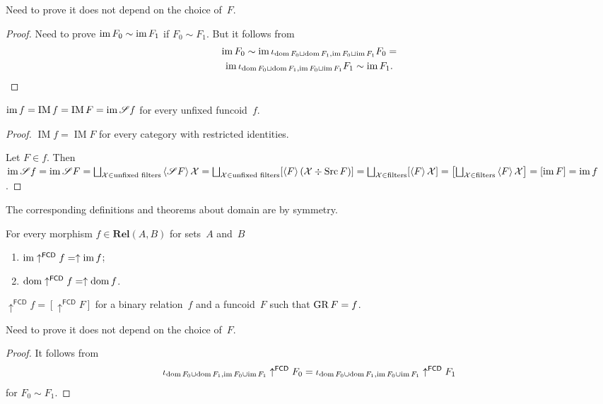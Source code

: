 Need to prove it does not depend on the choice of~$F$.

\begin{proof}
Need to prove $\operatorname{im} F_0\sim\operatorname{im} F_1$ if $F_0\sim F_1$. But it follows from
\begin{multline*}
\operatorname{im} F_0\sim\operatorname{im}\iota_{\operatorname{dom} F_0\sqcup\operatorname{dom} F_1,\operatorname{im} F_0\sqcup\operatorname{im} F_1}F_0=\\\operatorname{im}\iota_{\operatorname{dom} F_0\sqcup\operatorname{dom} F_1,\operatorname{im} F_0\sqcup\operatorname{im} F_1}F_1\sim\operatorname{im} F_1.
\end{multline*}
\end{proof}

\begin{thm}
$\operatorname{im} f = \operatorname{IM}f = \operatorname{IM}F = \operatorname{im}\mathscr{S}f$ for every unfixed funcoid~$f$.
\end{thm}

\begin{proof}
$\operatorname{IM}f = \operatorname{IM}F$ for every category with restricted identities.

Let $F\in f$. Then $\im\mathscr{S}f = \im\mathscr{S}F = \bigsqcup_{\mathcal{X}\in\text{unfixed filters}}{\supfun{\mathscr{S}F}\mathcal{X}} = \bigsqcup_{\mathcal{X}\in\text{unfixed filters}}[\supfun{F}(\mathcal{X}\div\Src F)]=
\bigsqcup_{\mathcal{X}\in\text{filters}}[\supfun{F}\mathcal{X}]=
\left[\bigsqcup_{\mathcal{X}\in\text{filters}}\supfun{F}\mathcal{X}\right]=
[\im F]=\im f$.
\end{proof}

The corresponding definitions and theorems about domain are by symmetry.

\begin{obvious}
For every morphism $f\in\mathbf{Rel}(A,B)$ for sets~$A$ and~$B$
\begin{enumerate}
\item $\operatorname{im}\uparrow^{\mathsf{FCD}}f=\uparrow\operatorname{im} f$;
\item $\operatorname{dom}\uparrow^{\mathsf{FCD}}f=\uparrow\operatorname{dom} f$.
\end{enumerate}
\end{obvious}

\begin{defn}
$\uparrow^{\mathsf{FCD}}f=[\uparrow^{\mathsf{FCD}}F]$ for a binary relation~$f$ and a funcoid~$F$ such that $\operatorname{GR} F=f$.
\end{defn}

Need to prove it does not depend on the choice of~$F$.

\begin{proof}
It follows from
\[
\iota_{\operatorname{dom} F_0\cup\operatorname{dom} F_1,\operatorname{im} F_0\cup\operatorname{im} F_1}\uparrow^{\mathsf{FCD}}F_0=\\
\iota_{\operatorname{dom} F_0\cup\operatorname{dom} F_1,\operatorname{im} F_0\cup\operatorname{im} F_1}\uparrow^{\mathsf{FCD}}F_1
\]
for $F_0\sim F_1$.
\end{proof}

